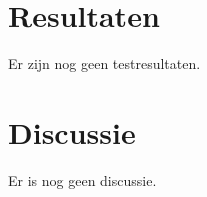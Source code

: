 \documentclass[a4paper,12pt]{article}
\begin{document}


\section{Resultaten}

Er zijn nog geen testresultaten.


\section{Discussie}

Er is nog geen discussie.







\end{document}

